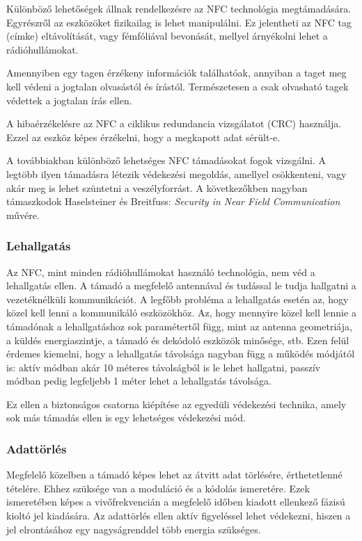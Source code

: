 \documentclass[12pt]{article}
\begin{document}
Különböző lehetőségek állnak rendelkezésre az NFC technológia megtámadására.
Egyrészről az eszközöket fizikailag is lehet manipulálni. Ez jelentheti az NFC
tag (címke) eltávolítását, vagy fémfóliával bevonását, mellyel árnyékolni lehet
a rádióhullámokat.

Amennyiben egy tagen érzékeny információk találhatóak, annyiban a taget meg kell
védeni a  jogtalan olvasástól és írástól. Természetesen a csak olvasható tagek
védettek a jogtalan írás ellen.

A hibaérzékelésre az NFC a ciklikus redundancia vizsgálatot (CRC) használja.
Ezzel az eszköz képes érzékelni, hogy a megkapott adat sérült-e. 

A továbbiakban különböző lehetséges NFC támadásokat fogok vizsgálni. A legtöbb
ilyen támadásra létezik védekezési megoldás, amellyel csökkenteni, vagy akár 
meg is lehet szüntetni a veszélyforrást. A következőkben nagyban támaszkodok
Haselsteiner és Breitfuss: \emph{Security in Near Field Communication}
\cite{nemetbiztonsagnfc} művére.


\subsubsection{Lehallgatás}
Az NFC, mint minden rádióhullámokat használó technológia, nem véd a lehallgatás
ellen. A támadó a megfelelő antennával és tudással le tudja hallgatni a 
vezetéknélküli kommunikációt. A legfőbb probléma a lehallgatás esetén az, 
hogy közel kell lenni a kommunikáló eszközökhöz. Az, hogy mennyire közel kell
lennie a támadónak a lehallgatáshoz sok paramétertől függ, mint az antenna 
geometriája, a küldés energiaszintje, a támadó és dekódoló eszközök minősége, stb.
Ezen felül érdemes kiemelni, hogy a lehallgatás távolsága nagyban függ a működés
módjától is: aktív módban akár 10 méteres távolságból is le lehet hallgatni, 
passzív módban pedig legfeljebb 1 méter lehet a lehallgatás távolsága.

Ez ellen a biztonságos csatorna kiépítése az egyedüli védekezési technika, 
amely sok más támadás ellen is egy lehetséges védekezési mód.

\subsubsection{Adattörlés}
Megfelelő közelben a támadó képes lehet az átvitt adat törlésére, érthetetlenné
tételére. Ehhez szüksége van a moduláció és a kódolás ismeretére. Ezek ismeretében
képes a vivőfrekvencián a megfelelő időben kiadott ellenkező fázisú kioltó jel
kiadására. 
Az adattörlés ellen aktív figyeléssel lehet védekezni, hiszen a jel elrontásához
egy nagyságrenddel több energia szükséges.
\end{document}
